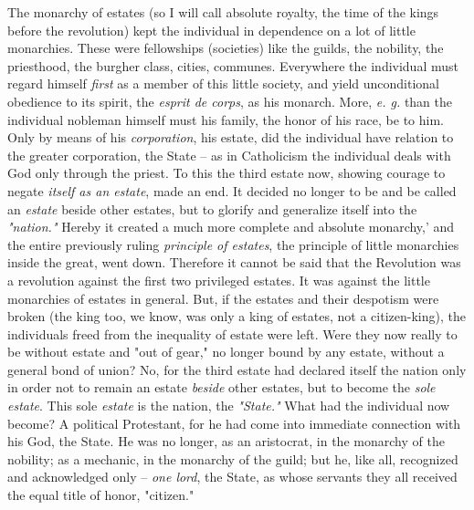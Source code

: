 The monarchy of estates (so I will call absolute royalty, the time of the 
kings before the revolution) kept the individual in dependence on a lot of 
little monarchies. These were fellowships (societies) like the guilds, the 
nobility, the priesthood, the burgher class, cities, communes. Everywhere the 
individual must regard himself \textit{first} as a member of this little 
society, and yield unconditional obedience to its spirit, the \textit{esprit 
de corps}, as his monarch. More, \textit{e. g.} than the individual nobleman 
himself must his family, the honor of his race, be to him. Only by means of 
his \textit{corporation}, his estate, did the individual have relation to the 
greater corporation, the State -- as in Catholicism the individual deals with 
God only through the priest. To this the third estate now, showing courage to 
negate \textit{itself as an estate}, made an end. It decided no longer to be 
and be called an \textit{estate} beside other estates, but to glorify and 
generalize itself into the \textit{"{}nation."{}} Hereby it created a much 
more complete and absolute monarchy,' and the entire previously ruling 
\textit{principle of estates}, the principle of little monarchies inside the 
great, went down. Therefore it cannot be said that the Revolution was a 
revolution against the first two privileged estates. It was against the little 
monarchies of estates in general. But, if the estates and their despotism were 
broken (the king too, we know, was only a king of estates, not a 
citizen-king), the individuals freed from the inequality of estate were left. 
Were they now really to be without estate and "{}out of gear,"{} no longer 
bound by any estate, without a general bond of union? No, for the third estate 
had declared itself the nation only in order not to remain an estate 
\textit{beside} other estates, but to become the \textit{sole estate}. This 
sole \textit{estate} is the nation, the \textit{"{}State."{}} What had the 
individual now become? A political Protestant, for he had come into immediate 
connection with his God, the State. He was no longer, as an aristocrat, in the 
monarchy of the nobility; as a mechanic, in the monarchy of the guild; but he, 
like all, recognized and acknowledged only -- \textit{one lord}, the State, as 
whose servants they all received the equal title of honor, "{}citizen."{}

